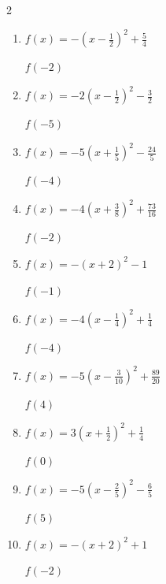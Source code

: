 


\setcounter{quesnum}{10}

\begin{multicols}{2}
\begin{enumerate}
  \itemsep=90pt
  \item $\displaystyle f(x)=-\left( x-\frac{1}{2}\right)^{2}+\frac{5}{4}$

$f(-2)$
        \phantom{$=-5$}

  \item $\displaystyle f(x)=-2\left( x-\frac{1}{2}\right)^{2}-\frac{3}{2}$

$f(-5)$
        \phantom{$=-62$}

  \item $\displaystyle f(x)=-5\left( x+\frac{1}{5}\right)^{2}-\frac{24}{5}$

$f(-4)$
        \phantom{$=-77$}

  \item $\displaystyle f(x)=-4\left( x+\frac{3}{8}\right)^{2}+\frac{73}{16}$

$f(-2)$
        \phantom{$=-6$}

  \item $\displaystyle f(x)=-\left( x+2\right)^{2}-1$

$f(-1)$
        \phantom{$=-2$}

\columnbreak %

  \item $\displaystyle f(x)=-4\left( x-\frac{1}{4}\right)^{2}+\frac{1}{4}$

$f(-4)$
        \phantom{$=-72$}

  \item $\displaystyle f(x)=-5\left( x-\frac{3}{10}\right)^{2}+\frac{89}{20}$

$f(4)$
        \phantom{$=-64$}

  \item $\displaystyle f(x)=3\left( x+\frac{1}{2}\right)^{2}+\frac{1}{4}$

$f(0)$
        \phantom{$=1$}

  \item $\displaystyle f(x)=-5\left( x-\frac{2}{5}\right)^{2}-\frac{6}{5}$

$f(5)$
        \phantom{$=-107$}

  \item $\displaystyle f(x)=-\left( x+2\right)^{2}+1$

$f(-2)$
        \phantom{$=1$}


\end{enumerate}
\end{multicols}
